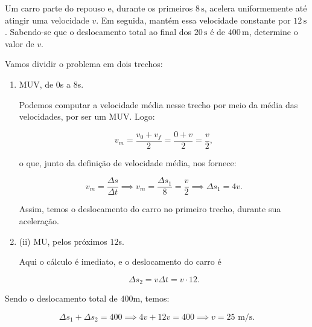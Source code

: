 \begin{exemplo}[Nível II]\label{exemplo_cinematica_muvvelocidademedia02}


Um carro parte do repouso e, durante os primeiros $8\,\text{s}$, acelera uniformemente até atingir uma velocidade $v$. Em seguida, mantém essa velocidade constante por $12\,\text{s}$. Sabendo-se que o deslocamento total ao final dos $20\,\text{s}$ é de $400\,\text{m}$, determine o valor de $v$.


\resolucao


Vamos dividir o problema em dois trechos:

\begin{enumerate}
    \item [(i)] MUV, de $0$s a $8$s.

     Podemos computar a velocidade média nesse trecho por meio da média das velocidades, por ser um MUV. Logo:

     $$v_m= \dfrac{v_0+v_f}{2}=\dfrac{0+v}{2}=\dfrac{v}{2},$$

     \noindent o que, junto da definição de velocidade média, nos fornece:

     $$ v_m = \dfrac{\Delta s}{\Delta t} \implies v_m =\dfrac{\Delta s_1}{8} = \dfrac{v}{2} \implies \boxed{\Delta s_1=4v.}$$

     Assim, temos o deslocamento do carro no primeiro trecho, durante sua aceleração.

     \item{(ii)} MU, pelos próximos $12$s.

     Aqui o cálculo é imediato, e o deslocamento do carro é

     $$\Delta s_2 = v \Delta t = v \cdot 12.$$
    
\end{enumerate}


Sendo o deslocamento total de $400$m, temos:

$$ \Delta s_1 + \Delta s_2 = 400 \implies 4v+12v=400 \implies \boxed{v=25 \text{ m/s.}}$$
  

\end{exemplo}

\vspace{0.3cm}






